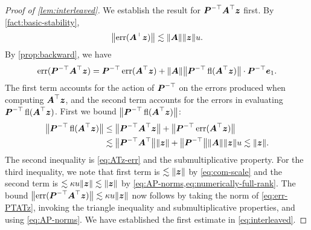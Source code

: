 \documentclass[onefignum,onetabnum,pagebackref,dvipsnames]{siamart220329}
\begin{document}
\begin{proof}[Proof of \cref{lem:interleaved}]
    We establish the result for $\boldsymbol{P}^{-\top}\boldsymbol{A}^\top\boldsymbol{z}$  first.
    By \cref{fact:basic-stability},  
    \begin{equation} \label{eq:ATz-err}
        \big\|\smash{\err(\mat{A}^\top\vec{z})}\big\|\lesssim \norm{\mat{A}}\norm{\vec{z}}u.
    \end{equation}
    By \cref{prop:backward}, we have
    \begin{equation} \label{eq:err-PTATz}
        \err(\mat{P}^{-\top}\mat{A}^\top\vec{z}) = \mat{P}^{-\top}\err(\mat{A}^\top\vec{z}) + \norm{\mat{A}} \big\| \mat{P}^{-\top}\fl(\mat{A}^\top\vec{z})\big\| \cdot \mat{P}^{-\top}\vec{e}_1.
    \end{equation}
    The first term accounts for the action of $\boldsymbol{P}^{-\top}$ on the errors produced when computing $\boldsymbol{A}^\top\boldsymbol{z}$, and the second term accounts for the errors in evaluating $\boldsymbol{P}^{-\top}\operatorname{fl}(\boldsymbol{A}^\top\boldsymbol{z})$.
    First we bound $\big\| \boldsymbol{P}^{-\top}\operatorname{fl}(\boldsymbol{A}^\top\boldsymbol{z})\big\|$:
    \begin{align*}
        \big\| \mat{P}^{-\top}\fl(\mat{A}^\top\vec{z})\big\| &\le \big\| \mat{P}^{-\top}\mat{A}^\top\vec{z}\big\| +  \big\| \mat{P}^{-\top}\err(\mat{A}^\top\vec{z})\big\| \\&\lesssim \big\| \mat{P}^{-\top}\mat{A}^\top\big\|\norm{\vec{z}} + \big\| \mat{P}^{-\top}\big\| \norm{\mat{A}}\norm{\vec{z}}u \lesssim \norm{\vec{z}}.
    \end{align*}
    The second inequality is \cref{eq:ATz-err} and the submultiplicative property.
    For the third inequality, we note that first term is $\lesssim \norm{\vec{z}}$ by \cref{eq:com-scale} and the second term is $\lesssim \kappa u \norm{\vec{z}} \lesssim \norm{\vec{z}}$ by \cref{eq:AP-norms,eq:numerically-full-rank}.
    The bound $\bigl\|\err(\mat{P}^{-\top}\mat{A}^\top\vec{z})\bigr\| \lesssim \kappa u \norm{\vec{z}}$ now follows by taking the norm of \cref{eq:err-PTATz}, invoking the triangle inequality and submultiplicative properties, and using \cref{eq:AP-norms}.
    We have established the first estimate in \cref{eq:interleaved}.


\end{proof}
\end{document}
